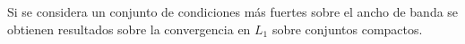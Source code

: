 \begin{itemize}

Si se considera un conjunto de condiciones más fuertes sobre el ancho de banda se obtienen resultados sobre la convergencia en $L_1$ sobre conjuntos compactos. 


\end{itemize}
